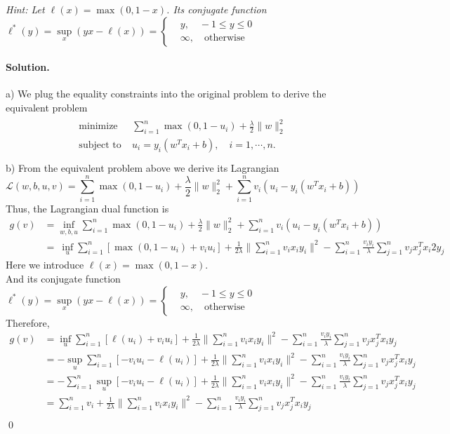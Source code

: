 \documentclass[a4paper]{article}
\newenvironment{solution}
{\color{blue} \paragraph{Solution.\\}}
{\newline \qed}
\begin{document}
\noindent\emph{Hint: Let $\ell(x)=\max(0,1-x)$. Its conjugate function $\ell^\ast(y)=\sup\limits_{x}(yx-\ell(x))=\left\{
\begin{aligned}
&y, \quad-1\leq y\leq0 \\
&\infty,\quad\text{otherwise}
\end{aligned}
\right.$}
\begin{solution}
a) We plug the equality constraints into the original problem to derive the equivalent problem
\begin{gather*}
\begin{matrix}
\text{minimize~~} &\sum_{i=1}^n\max\left(0,1-u_i\right)+\frac{\lambda}{2}\|w\|_2^2\\
\text{subject to} &u_i=y_i(w^Tx_i+b),\quad i=1,\cdots,n.~~\\
\end{matrix}
\end{gather*}
\quad b) From the equivalent problem above we derive its Lagrangian
$$\mathcal{L}(w,b,u,v)=\sum_{i=1}^n\max\left(0,1-u_i\right)+\frac{\lambda}{2}\|w\|_2^2+\sum_{i=1}^nv_i(u_i-y_i(w^Tx_i+b))$$ 
Thus, the Lagrangian dual function is 
\begin{equation}\nonumber
\begin{aligned}
g(v)&=\inf_{w,b,u}\sum_{i=1}^n\max\left(0,1-u_i\right)+\frac{\lambda}{2}\|w\|_2^2+\sum_{i=1}^nv_i(u_i-y_i(w^Tx_i+b))\\ &=\ \inf_{u}\sum_{i=1}^n\left[\max\left(0,1-u_i\right)+v_iu_i\right]+\frac{1}{2\lambda}\|\sum_{i=1}^nv_ix_iy_i\|^2-\sum_{i=1}^n\frac{v_iy_i}{\lambda}\sum_{j=1}^nv_jx_j^Tx_i2y_j
\end{aligned}
\end{equation}
Here we introduce $\ell(x)=\max(0,1-x)$. \\And its conjugate function $\ell^\ast(y)=\sup\limits_{x}(yx-\ell(x))=\left\{
\begin{aligned}
&y, \quad-1\leq y\leq0 \\
&\infty,\quad\text{otherwise}
\end{aligned}
\right.$\\ 
Therefore,
\begin{equation}\nonumber
\begin{aligned}
g(v) &= \inf_{u}\sum_{i=1}^n\left[\ell(u_i)+v_iu_i\right]+\frac{1}{2\lambda}\|\sum_{i=1}^nv_ix_iy_i\|^2-\sum_{i=1}^n\frac{v_iy_i}{\lambda}\sum_{j=1}^nv_jx_j^Tx_iy_j\\ &= -\sup_u\sum_{i=1}^n\left[-v_iu_i-\ell(u_i)\right]+\frac{1}{2\lambda}\|\sum_{i=1}^nv_ix_iy_i\|^2-\sum_{i=1}^n\frac{v_iy_i}{\lambda}\sum_{j=1}^nv_jx_j^Tx_iy_j\\ &= -\sum_{i=1}^n\sup_u\left[-v_iu_i-\ell(u_i)\right]+\frac{1}{2\lambda}\|\sum_{i=1}^nv_ix_iy_i\|^2-\sum_{i=1}^n\frac{v_iy_i}{\lambda}\sum_{j=1}^nv_jx_j^Tx_iy_j\\ &= \sum_{i=1}^nv_i+\frac{1}{2\lambda}\|\sum_{i=1}^nv_ix_iy_i\|^2-\sum_{i=1}^n\frac{v_iy_i}{\lambda}\sum_{j=1}^nv_jx_j^Tx_iy_j\\

\end{aligned}
\end{equation}
\end{solution}
\end{document}
